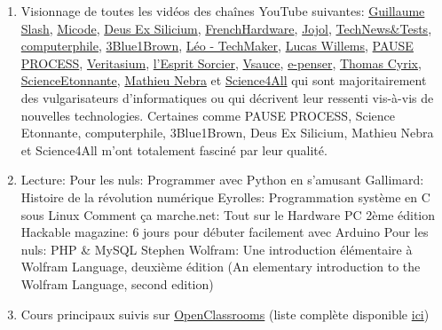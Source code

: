 \documentclass{article}
\begin{document}
		\begin{enumerate}

			\item Visionnage de toutes les vidéos des chaînes YouTube suivantes:
				\subitem \href{https://www.youtube.com/channel/UCOLNDRtP8tUK5i-6jLO0r4Q}{Guillaume Slash}, \href{https://www.youtube.com/channel/UCYnvxJ-PKiGXo_tYXpWAC-w}{Micode}, \href{https://www.youtube.com/user/dexsilicium}{Deus Ex Silicium}, \href{https://www.youtube.com/channel/UCU8_onYYhNxwGUB3hA34C4Q}{FrenchHardware}, \href{https://www.youtube.com/user/jojol67}{Jojol}, \href{}{} \href{https://www.youtube.com/user/TechNewsTests}{TechNews\&Tests}, \href{https://www.youtube.com/user/Computerphile}{computerphile}, \href{https://www.youtube.com/watch?v=aircAruvnKk&list=PLZHQObOWTQDNU6R1_67000Dx_ZCJB-3pi}{3Blue1Brown}, \href{https://www.youtube.com/channel/UCRhyS_ylPQ5GWBl1lK92ftA}{Léo - TechMaker}, \href{https://www.youtube.com/watch?v=A5dl7XRnmM4&list=PL5TvtEevd4IbBjsZe94pdU8r98DVr71rm}{Lucas Willems}, \href{https://www.youtube.com/channel/UC0JUkXAVVA4qWH1BQRs5N3A}{PAUSE PROCESS}, \href{https://www.youtube.com/watch?v=IcrBqCFLHIY}{Veritasium}, \href{https://www.youtube.com/watch?v=2aCS5mEeiwg}{l'Esprit Sorcier}, \href{https://www.youtube.com/watch?v=G5s4-Kak49o}{Vsauce}, \href{https://www.youtube.com/watch?v=pXKMIJ8GOPg}{e-penser}, \href{https://www.youtube.com/channel/UCEKlKgrnLlkSzG-MKMYoSMA}{Thomas Cyrix}, \href{https://www.youtube.com/watch?v=xuBzQ38DNhE}{ScienceEtonnante}, \href{https://www.youtube.com/watch?v=I5dUx-l-HmE}{Mathieu Nebra} et \href{https://www.youtube.com/watch?v=DrjkjPVf7Bw}{Science4All} qui sont majoritairement des vulgarisateurs d'informatiques ou qui décrivent leur ressenti vis-à-vis de nouvelles technologies. Certaines comme PAUSE PROCESS, Science Etonnante, computerphile, 3Blue1Brown, Deus Ex Silicium, Mathieu Nebra et Science4All m'ont totalement fasciné par leur qualité.
			\item Lecture:
				\subitem Pour les nuls: Programmer avec Python en s'amusant
				\subitem Gallimard: Histoire de la révolution numérique 
				\subitem Eyrolles: Programmation système en C sous Linux
				\subitem Comment ça marche.net: Tout sur le Hardware PC 2ème édition
				\subitem Hackable magazine: 6 jours pour débuter facilement avec Arduino
				\subitem Pour les nuls: PHP \& MySQL
				\subitem Stephen Wolfram: Une introduction élémentaire à Wolfram Language, deuxième édition (An elementary introduction to the Wolfram Language, second edition)
		
		\item Cours principaux suivis sur \href{https://openclassrooms.com/fr/membres/benjaminloison}{OpenClassrooms} (liste complète disponible \href{https://github.com/Benjamin-Loison/Curriculum-vitae/blob/master/Lessons\%20followed\%20on\%20OpenClassrooms.pdf}{ici})
	

\end{enumerate}
\end{document}
